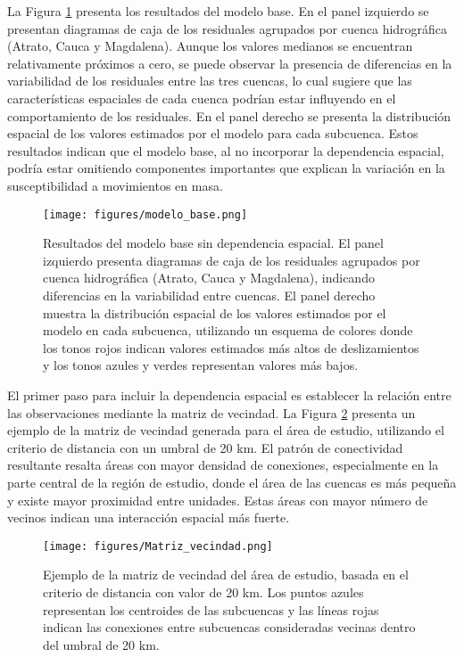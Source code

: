 \documentclass[
  manuscript=article,  
  layout=preprint,  
  year=2023,
  volume=0,
]{format}
\begin{document}
La Figura \ref{fig:base} presenta los resultados del modelo base. En el panel izquierdo se presentan diagramas de caja de los residuales agrupados por cuenca hidrográfica (Atrato, Cauca y Magdalena). Aunque los valores medianos se encuentran relativamente próximos a cero, se puede observar la presencia de diferencias en la variabilidad de los residuales entre las tres cuencas, lo cual sugiere que las características espaciales de cada cuenca podrían estar influyendo en el comportamiento de los residuales. En el panel derecho se presenta la distribución espacial de los valores estimados por el modelo para cada subcuenca. Estos resultados indican que el modelo base, al no incorporar la dependencia espacial, podría estar omitiendo componentes importantes que explican la variación en la susceptibilidad a movimientos en masa.

\begin{figure}[ht!]
    \centering
        \centering
        \texttt{[image: figures/modelo\_base.png]}
        \caption{Resultados del modelo base sin dependencia espacial. El panel izquierdo presenta diagramas de caja de los residuales agrupados por cuenca hidrográfica (Atrato, Cauca y Magdalena), indicando diferencias en la variabilidad entre cuencas. El panel derecho muestra la distribución espacial de los valores estimados por el modelo en cada subcuenca, utilizando un esquema de colores donde los tonos rojos indican valores estimados más altos de deslizamientos y los tonos azules y verdes representan valores más bajos.}
        \label{fig:base}
\end{figure}

El primer paso para incluir la dependencia espacial es establecer la relación entre las observaciones mediante la matriz de vecindad. La Figura \ref{fig:matrix} presenta un ejemplo de la matriz de vecindad generada para el área de estudio, utilizando el criterio de distancia con un umbral de 20 km. El patrón de conectividad resultante resalta áreas con mayor densidad de conexiones, especialmente en la parte central de la región de estudio, donde el área de las cuencas es más pequeña y existe mayor proximidad entre unidades. Estas áreas con mayor número de vecinos indican una interacción espacial más fuerte.

\begin{figure}[ht!]
    \centering
      {\texttt{[image: figures/Matriz\_vecindad.png]}}
\caption{Ejemplo de la matriz de vecindad del área de estudio, basada en el criterio de distancia con valor de 20 km. Los puntos azules representan los centroides de las subcuencas y las líneas rojas indican las conexiones entre subcuencas consideradas vecinas dentro del umbral de 20 km.}
    \label{fig:matrix}
\end{figure}
\end{document}
